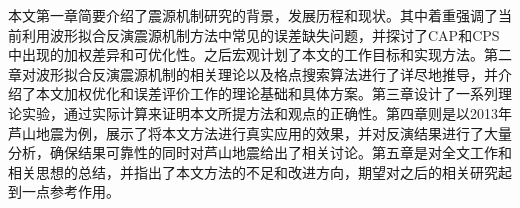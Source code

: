 \begin{cnabstract}
本文第一章简要介绍了震源机制研究的背景，发展历程和现状。其中着重强调了当前利用波形拟合反演震源机制方法中常见的误差缺失问题，并探讨了CAP和CPS中出现的加权差异和可优化性。之后宏观计划了本文的工作目标和实现方法。第二章对波形拟合反演震源机制的相关理论以及格点搜索算法进行了详尽地推导，并介绍了本文加权优化和误差评价工作的理论基础和具体方案。第三章设计了一系列理论实验，通过实际计算来证明本文所提方法和观点的正确性。第四章则是以2013年芦山地震为例，展示了将本文方法进行真实应用的效果，并对反演结果进行了大量分析，确保结果可靠性的同时对芦山地震给出了相关讨论。第五章是对全文工作和相关思想的总结，并指出了本文方法的不足和改进方向，期望对之后的相关研究起到一点参考作用。

\end{cnabstract}
\vspace{1em}\par\vfill





